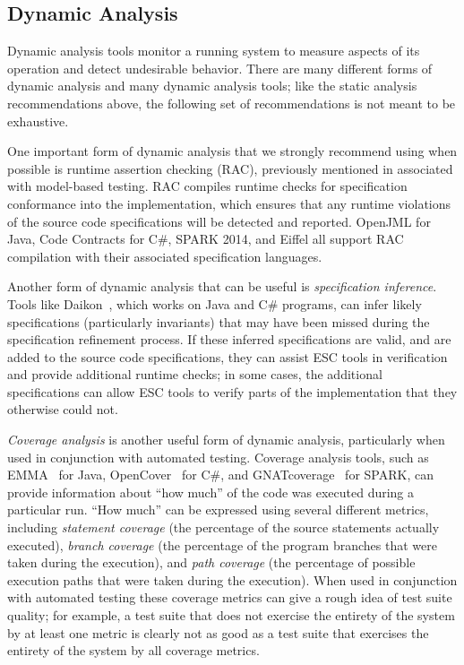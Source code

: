 \subsection{Dynamic Analysis}

Dynamic analysis tools monitor a running system to measure aspects of
its operation and detect undesirable behavior. There are many
different forms of dynamic analysis and many dynamic analysis tools;
like the static analysis recommendations above, the following set of
recommendations is not meant to be exhaustive.

One important form of dynamic analysis that we strongly recommend
using when possible is runtime assertion checking (RAC), previously
mentioned in associated with model-based testing. RAC compiles runtime
checks for specification conformance into the implementation, which
ensures that any runtime violations of the source code specifications
will be detected and reported. OpenJML for Java, Code Contracts for
C\#, SPARK 2014, and Eiffel all support RAC compilation with their
associated specification languages.

Another form of dynamic analysis that can be useful is
\emph{specification inference}. Tools like Daikon~\cite{Ernst2007},
which works on Java and C\# programs, can infer likely specifications
(particularly invariants) that may have been missed during the
specification refinement process. If these inferred specifications are
valid, and are added to the source code specifications, they can
assist ESC tools in verification and provide additional runtime
checks; in some cases, the additional specifications can allow ESC
tools to verify parts of the implementation that they otherwise could
not.

\emph{Coverage analysis} is another useful form of dynamic analysis,
particularly when used in conjunction with automated testing. Coverage
analysis tools, such as EMMA~\cite{EMMA} for Java,
OpenCover~\cite{OpenCover} for C\#, and
GNATcoverage~\cite{GNATcoverage} for SPARK, can provide information
about ``how much'' of the code was executed during a particular
run. ``How much'' can be expressed using several different metrics,
including \emph{statement coverage} (the percentage of the source
statements actually executed), \emph{branch coverage} (the percentage
of the program branches that were taken during the execution), and
\emph{path coverage} (the percentage of possible execution paths that
were taken during the execution). When used in conjunction with
automated testing these coverage metrics can give a rough idea of test
suite quality; for example, a test suite that does not exercise the
entirety of the system by at least one metric is clearly not as good
as a test suite that exercises the entirety of the system by all
coverage metrics. 

